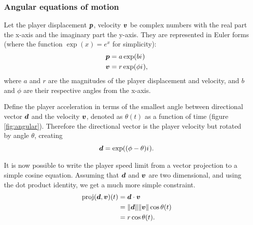 
\subsubsection{Angular equations of motion}
Let the player displacement $\boldsymbol{p}$, velocity $\boldsymbol{v}$ be complex numbers with the real part the x-axis and the imaginary part the y-axis. They are represented in Euler forms (where the function $\exp(x)= e^{x}$ for simplicity):
\begin{align*}
    \boldsymbol{p} &= a \exp(b {i\mkern1mu})\\
    \boldsymbol{v} &= r \exp(\phi {i\mkern1mu}),
\end{align*}
where $a$ and $r$ are the magnitudes of the player displacement and velocity, and $b$ and $\phi$ are their respective angles from the x-axis.

Define the player acceleration in terms of the smallest angle between directional vector $\boldsymbol{d}$ and the velocity $\boldsymbol{v}$, denoted as $\theta(t)$ as a function of time (figure \ref{fig:angular}). Therefore the directional vector is the player velocity but rotated by angle $\theta$, creating
\[
\boldsymbol{d} = \exp((\phi - \theta) {i\mkern1mu}).
\]


%
It is now possible to write the player speed limit from a vector projection to a simple cosine equation. Assuming that $\boldsymbol{d}$ and $\boldsymbol{v}$ are two dimensional, and using the dot product identity, we get a much more simple constraint.
\begin{align*}
    \text{proj}(\boldsymbol{d}, \boldsymbol{v})(t) &= \boldsymbol{d} \cdot \boldsymbol{v}\\
    &= \|\boldsymbol{d}\| \|\boldsymbol{v}\| \cos \theta(t)\\
    &= r \cos \theta(t).
\end{align*}



